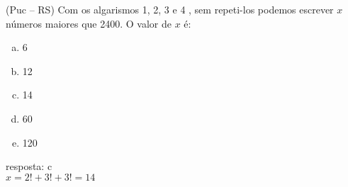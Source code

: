 \begin{ex}
(Puc – RS) Com os algarismos 1, 2, 3 e 4 , sem repeti-los podemos escrever $x$ números maiores que 2400. O valor de $x$ é:
   \begin{enumerate}[(a)]
   \item 6
   \item 12
   \item 14
   \item 60
   \item 120
   \end{enumerate}
    \begin{sol}
      resposta: c \\
      $x=2!+3!+3!=14$
    \end{sol}
\end{ex}
